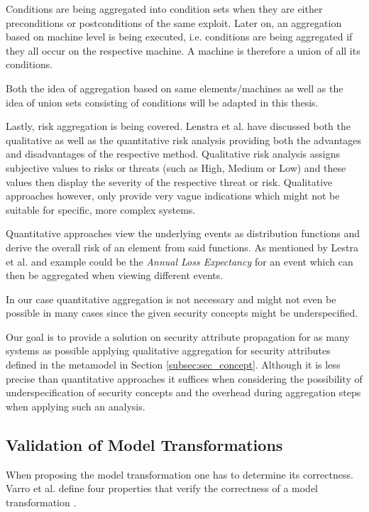 Conditions are being aggregated into condition sets when they are either preconditions or postconditions of the same exploit. Later on, an aggregation based on machine level is being executed, i.e. conditions are being aggregated if they all occur on the respective machine. A machine is therefore a union of all its conditions. 

Both the idea of aggregation based on same elements/machines as well as the idea of union sets consisting of conditions will be adapted in this thesis.

Lastly, risk aggregation is being covered. Lenstra et al. \cite{Lenstra2004}  have discussed both the qualitative as well as the quantitative risk analysis providing both the advantages and disadvantages of the respective method. Qualitative risk analysis assigns subjective values to risks or threats (such as High, Medium or Low) and these values then display the severity of the respective threat or risk. Qualitative approaches however, only provide very vague indications which might not be suitable for specific, more complex systems. 

Quantitative approaches view the underlying events as distribution functions and derive the overall risk of an element from said functions. As mentioned by Lestra et al. and example could be the \textit{Annual Loss Expectancy} for an event which can then be aggregated when viewing different events.

In our case quantitative aggregation is not necessary and might not even be possible in many cases since the given security concepts might be underspecified. 

Our goal is to provide a solution on security attribute propagation for as many systems as possible applying qualitative aggregation for security attributes defined in the metamodel in Section \ref{subsec:sec_concept}. Although it is less precise than quantitative approaches \cite{Lenstra2004} it suffices when considering the possibility of underspecification of security concepts and the overhead during aggregation steps when applying such an analysis.

\subsection{Validation of Model Transformations}

When proposing the model transformation one has to determine its correctness. Varro et al. define four properties that verify the correctness of a model transformation \cite{vacca2012computer}.

